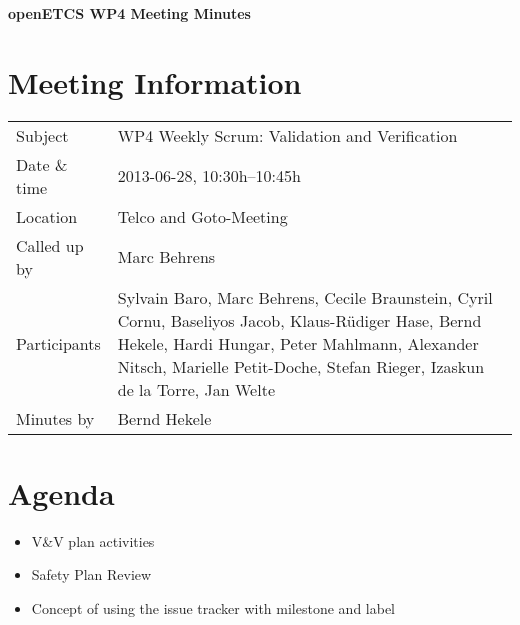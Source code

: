 \documentclass[a4paper, 11pt]{article}
\begin{document}
{\begin{center}\huge\bf openETCS WP4 Meeting Minutes\end{center}}
\section{Meeting Information}

\renewcommand{\arraystretch}{1.5}
\begin{supertabular}{m{.2\textwidth}m{.8\textwidth}}
Subject & WP4 Weekly Scrum: Validation and Verification\\
Date \& time & 2013-06-28, 10:30h--10:45h\\
Location & Telco and Goto-Meeting\\
Called up by & Marc Behrens\\
Participants &
Sylvain Baro,
Marc Behrens,
Cecile Braunstein,
Cyril Cornu,
Baseliyos Jacob,
Klaus-R\"udiger Hase,
Bernd Hekele,
Hardi Hungar,
Peter Mahlmann,
Alexander Nitsch,
Marielle Petit-Doche,
Stefan Rieger,
Izaskun de la Torre,
Jan Welte
\\

Minutes by & Bernd Hekele\\

\end{supertabular}
\renewcommand{\arraystretch}{1.0}


\section{{Agenda}}
\begin{itemize}
\item V\&V plan activities
\item Safety Plan Review
\item Concept of using the issue tracker with milestone and label
\end{itemize}
\end{document}
